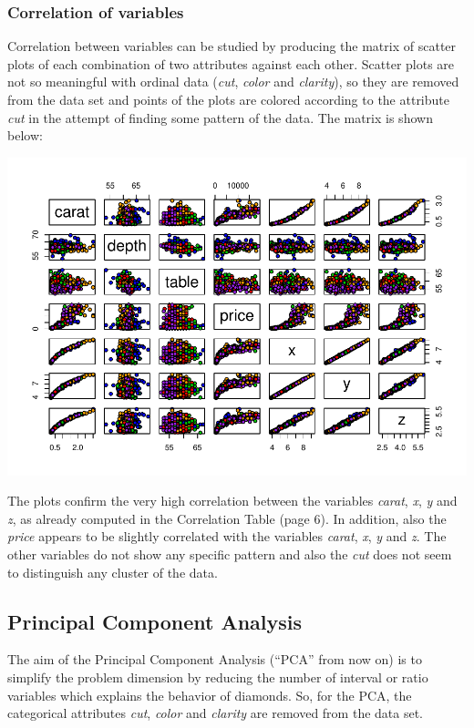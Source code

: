 \documentclass[
]{article}
\begin{document}
\newpage

\subsubsection{Correlation of variables}\label{correlation-of-variables}

Correlation between variables can be studied by producing the matrix of
scatter plots of each combination of two attributes against each other.
Scatter plots are not so meaningful with ordinal data (\emph{cut},
\emph{color} and \emph{clarity}), so they are removed from the data set
and points of the plots are colored according to the attribute
\emph{cut} in the attempt of finding some pattern of the data. The
matrix is shown below:

\includegraphics{Report_files/figure-latex/unnamed-chunk-9-1.pdf}

The plots confirm the very high correlation between the variables
\emph{carat}, \emph{x}, \emph{y} and \emph{z}, as already computed in
the Correlation Table (page 6). In addition, also the \emph{price}
appears to be slightly correlated with the variables \emph{carat},
\emph{x}, \emph{y} and \emph{z}. The other variables do not show any
specific pattern and also the \emph{cut} does not seem to distinguish
any cluster of the data.

\newpage

\subsection{Principal Component
Analysis}\label{principal-component-analysis}

The aim of the Principal Component Analysis (``PCA'' from now on) is to
simplify the problem dimension by reducing the number of interval or
ratio variables which explains the behavior of diamonds. So, for the
PCA, the categorical attributes \emph{cut}, \emph{color} and
\emph{clarity} are removed from the data set.
\end{document}
